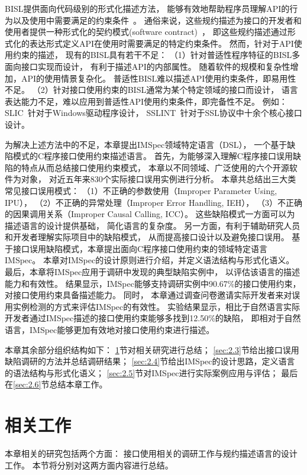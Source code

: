 BISL提供面向代码级别的形式化描述方法，
能够有效地帮助程序员理解API的行为以及使用中需要满足的约束条件~\cite{survey12}。
通俗来说，这些规约描述为接口的开发者和使用者提供一种形式化的契约模式(software contract)~\cite{92-ieee-contract}，
即这些规约描述通过形式化的表达形式定义API在使用时需要满足的特定约束条件。
然而，针对于API使用约束的描述，
现有的BISL具有若干不足：
（1）针对普适性程序特征的BISL多面向接口实现而设计，
有利于描述API的内部属性。
随着软件的规模和复杂性增加，API的使用情景复杂化。
普适性BISL难以描述API使用约束条件，即易用性不足。
（2）针对接口使用约束的BISL通常为某个特定领域的接口而设计，
语言表达能力不足，难以应用到普适性API使用约束条件，即完备性不足。
例如：SLIC~\cite{01-slic}针对于Windows驱动程序设计，
SSLINT~\cite{15-sp-sslint}针对于SSL协议中十余个核心接口设计。


为解决上述方法中的不足，本章提出IMSpec领域特定语言（DSL），
一个基于缺陷模式的C程序接口使用约束描述语言。
首先，为能够深入理解C程序接口误用缺陷的特点从而总结接口使用约束模式，
本章以不同领域、广泛使用的六个开源软件为对象，
对近五年来830个实际接口误用实例进行分析。
本章共总结出三大类常见接口误用模式：
（1）不正确的参数使用（Improper Parameter Using, IPU），
（2）不正确的异常处理（Improper Error Handling, IEH），
（3）不正确的因果调用关系（Improper Causal Calling, ICC）。
这些缺陷模式一方面可以为描述语言的设计提供基础，
简化语言的复杂度。
另一方面，有利于辅助研究人员和开发者理解实际项目中的缺陷模式，
从而提高接口设计以及避免接口误用。
基于接口误用缺陷模式，本章提出面向C程序接口使用约束的领域特定语言IMSpec。
本章对IMSpec的设计原则进行介绍，并定义语法结构与形式化语义。
最后，本章将IMSpec应用于调研中发现的典型缺陷实例中，
以评估该语言的描述能力和有效性。
结果显示，IMSpec能够支持调研实例中90.67\%的接口使用约束，
对接口使用约束具备描述能力。
同时，
本章通过调查问卷邀请实际开发者来对误用实例检测的方式来评估IMSpec的有效性。
实验结果显示，相比于自然语言实际开发者通过IMSpec描述的接口使用约束能够多找到12.50\%的缺陷，
即相对于自然语言，IMSpec能够更加有效地对接口使用约束进行描述。


本章其余部分组织结构如下：
\ref{sec:2.2}节对相关研究进行总结；
\ref{sec:2.3}节给出接口误用缺陷调研的方法并总结调研结果；
\ref{sec:2.4}节给出IMSpec的设计思路，定义语言的语法结构与形式化语义；
\ref{sec:2.5}节对IMSpec进行实际案例应用与评估；
最后在\ref{sec:2.6}节总结本章工作。

\section{相关工作}
\label{sec:2.2}
本章相关的研究包括两个方面：
接口使用相关的调研工作与规约描述语言的设计工作。
本节将分别对这两方面内容进行总结。

